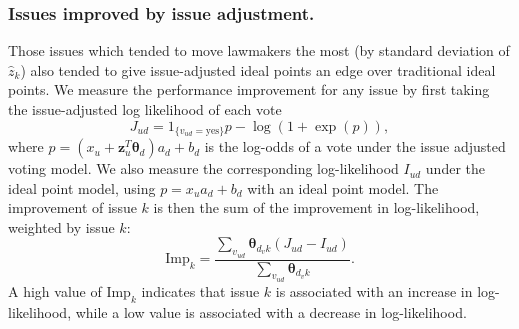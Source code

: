 \subsubsection{Issues improved by issue adjustment.}
Those issues which tended to move lawmakers the most (by standard
deviation of $\hat z_k$) also tended to give issue-adjusted ideal
points an edge over traditional ideal points.  We measure the
performance improvement for any issue by first taking the
issue-adjusted log likelihood of each vote
\begin{equation}
  J_{ud} = 1_{\{v_{ud} = \mbox{yes}\}} p - \log(1 + \exp(p)),
\end{equation}
where $p = (x_u + \bm z_{u}^T \bm \theta_d ) a_d + b_d$ is the
log-odds of a vote under the issue adjusted voting model.  We also
measure the corresponding log-likelihood $I_{ud}$ under the ideal
point model, using $p=x_u a_d + b_d$ with an ideal point model. The
improvement of issue $k$ is then the sum of the improvement in
log-likelihood, weighted by issue $k$:
\begin{equation}
  \label{equation:likelihood_improvement}
  \mbox{Imp}_k = \frac{\sum_{v_{ud}} \bm \theta_{d_v k} (J_{ud} - I_{ud}) }
       { \sum_{v_{ud}} \bm \theta_{d_v k} }.
\end{equation}
A high value of $\mbox{Imp}_k$ indicates that issue $k$ is associated
with an increase in log-likelihood, while a low value is associated
with a decrease in log-likelihood.

